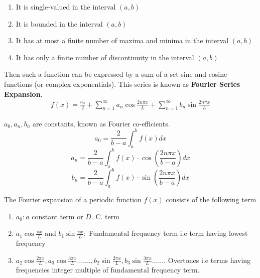 \begin{enumerate}
	\item It is single-valued in the interval $(a, b)$
	\item It is bounded in the interval $(a, b)$
	\item It has at most a finite number of maxima and minima in the interval $(a, b)$
	\item It has only a finite number of discontinuity in the interval $(a, b)$
\end{enumerate}
\begin{theorem}\label{geneq}
	Then such a function can be expressed by a sum of a set  sine and cosine functions (or complex exponentials). This series is known as \textbf{Fourier Series Expansion}.\\
	\begin{equation}
	\begin{array}{c}
	f(x)=\frac{a_{0}}{2}+\sum_{n=1}^{\infty} a_{n} \cos \frac{2n \pi x}{L}+\sum_{n=1}^{\infty} b_{n} \sin \frac{2n \pi x}{L}
	\end{array}
	\end{equation}
	
	$a_{0}, a_{n}, b_{n}$ are constants, known as Fourier co-efficients.
	\begin{equation}
	a_{0}=\frac{2}{b-a} \int_{a}^{b} f(x) d x
	\end{equation}
	\begin{equation}
	a_{n}=\frac{2}{b-a} \int_{a}^{b} f(x) \cdot \cos \left(\frac{2 n \pi x}{b-a}\right) d x
	\end{equation}
	\begin{equation}
	b_{n}=\frac{2}{b-a} \int_{a}^{b} f(x) \cdot \sin \left(\frac{2 n \pi x}{b-a}\right) d x
	\end{equation}
\end{theorem}
The Fourier expansion of a periodic function $f(x)$ consists of the following term
\begin{enumerate}
	\item $a_{0}: a$ constant term or $D .$ C. term
	\item $a_{1} \cos \frac{\pi x}{L}$ and $b_{1} \sin \frac{\pi x}{L}:$ Fundamental frequency term i.e term having lowest frequency
	\item $a_{2} \cos \frac{2 \pi x}{L}, a_{3} \cos \frac{3 \pi x}{L} \ldots \ldots ., b_{2} \sin \frac{2 \pi x}{L}, b_{3} \sin \frac{3 \pi x}{L} \ldots \ldots .$ Overtones i.e terms having
	frequencies integer multiple of fundamental frequency term.
\end{enumerate}

